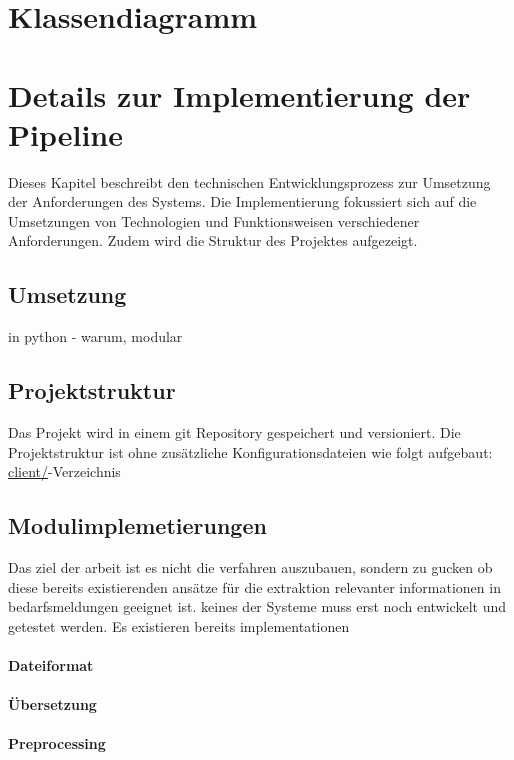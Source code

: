 \section{Klassendiagramm}
\newpage
\section{Details zur Implementierung der Pipeline}
Dieses Kapitel beschreibt den technischen Entwicklungsprozess zur Umsetzung der Anforderungen des Systems. Die Implementierung fokussiert sich auf die Umsetzungen von Technologien und Funktionsweisen verschiedener Anforderungen. Zudem wird die Struktur des Projektes aufgezeigt.
\subsection{Umsetzung}
in python - warum, modular
\subsection{Projektstruktur}
Das Projekt wird in einem git Repository gespeichert und versioniert. Die Projektstruktur ist ohne zusätzliche Konfigurationsdateien wie folgt aufgebaut:
\url{client/}-Verzeichnis

\subsection{Modulimplemetierungen}
Das ziel der arbeit ist es nicht die verfahren auszubauen, sondern zu gucken ob diese bereits existierenden ansätze für die extraktion relevanter informationen in bedarfsmeldungen geeignet ist. keines der Systeme muss erst noch entwickelt und getestet werden. Es existieren bereits implementationen

\paragraph{Dateiformat}

\paragraph{Übersetzung}

\paragraph{Preprocessing}

